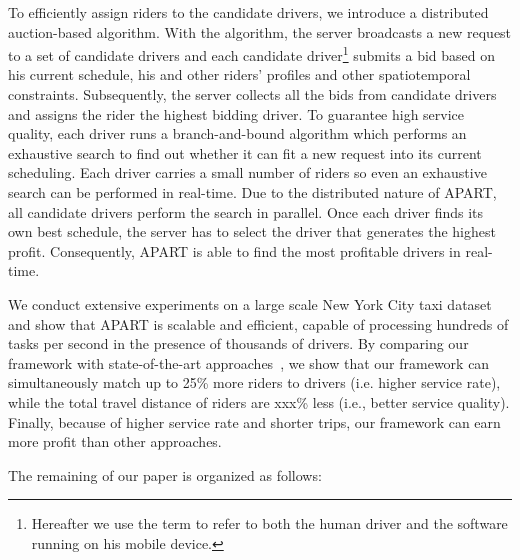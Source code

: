 To efficiently assign riders to the candidate drivers, we introduce a distributed auction-based algorithm. With the algorithm, the server broadcasts a new request to a set of candidate drivers and each candidate driver\footnote{Hereafter we use the term  to refer to both the human driver and the software running on his mobile device.} submits a bid based on his current schedule, his and other riders' profiles and other spatiotemporal constraints. Subsequently, the server collects all the bids from candidate drivers and assigns the rider the highest bidding driver. To guarantee high service quality, each driver runs a branch-and-bound algorithm which performs an exhaustive search to find out whether it can fit a new request into its current scheduling. Each driver carries a small number of riders so even an exhaustive search can be performed in real-time. Due to the distributed nature of APART, all candidate drivers perform the search in parallel. Once each driver finds its own best schedule, the server has to select the driver that generates the highest profit. Consequently, APART is able to find the most profitable drivers in real-time. 


We conduct extensive experiments on a large scale New York City taxi dataset and show that APART is scalable and efficient, capable of processing hundreds of tasks per second in the presence of thousands of drivers. By comparing our framework with state-of-the-art approaches~\cite{Huang14}, we show that our framework can simultaneously match up to 25\% more riders to drivers (i.e. higher service rate), while the total travel distance of riders are xxx\% less (i.e., better service quality). Finally, because of higher service rate and shorter trips, our framework can earn more profit than other approaches.

The remaining of our paper is organized as follows:


